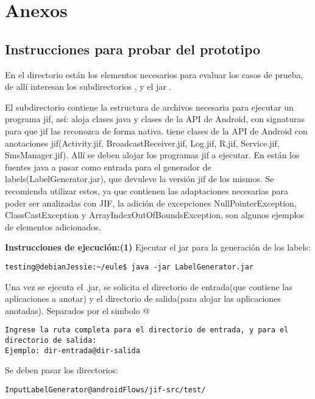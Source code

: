 \label{ch:anexos}
\chapter{Anexos}
\section{Instrucciones para probar del prototipo}
En el directorio \small{} están los elementos
necesarios para evaluar los casos de prueba, de allí interesan los
subdirectorios \small{},
\small{} y el jar
\small{}.

El subdirectorio \small{} contiene la estructura de
archivos necesaria para ejecutar un programa jif, así:
\small{} aloja clases java y clases de la API de Android, con
signaturas para que jif las reconozca de forma nativa.
\small{} tiene clases de la API de Android con
anotaciones jif(Activity.jif, BroadcastReceiver.jif, Log.jif, R.jif,
Service.jif, SmsManager.jif). Allí se deben alojar los programas jif a
ejecutar.\newline 
En {\small{}} están los fuentes java a pasar como
entrada para el generador de labels(LabelGenerator.jar), que devuleve la
versión jif de los mismos. Se recomienda utilizar estos, ya que contienen las
adaptaciones necesarias para poder ser analizadas con JIF, la adición de
excepciones NullPointerException, ClassCastException y
ArrayIndexOutOfBoundsException, son algunos ejemplos de elementos adicionados.

 \textbf{Instrucciones de
ejecución:}\newline \textbf{(1)} Ejecutar el jar para la generación de los labels:
\begin{lstlisting}
testing@debianJessie:~/eule$ java -jar LabelGenerator.jar
\end{lstlisting}
Una vez se ejecuta el .jar, se solicita el directorio de entrada(que contiene
las aplicaciones a anotar) y el directorio de salida(para alojar las
aplicaciones anotadas). Separados por el simbolo @
\begin{lstlisting}
Ingrese la ruta completa para el directorio de entrada, y para el 
directorio de salida:
Ejemplo: dir-entrada@dir-salida 
\end{lstlisting}
Se deben pasar los directorios:
\begin{lstlisting}
InputLabelGenerator@androidFlows/jif-src/test/
\end{lstlisting}

